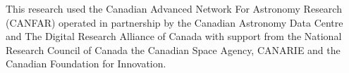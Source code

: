 This research used the Canadian Advanced Network For Astronomy Research (CANFAR) operated in partnership by the Canadian Astronomy Data Centre and The Digital Research Alliance of Canada with support from the National Research Council of Canada the Canadian Space Agency, CANARIE and the Canadian Foundation for Innovation.

\clearpage





